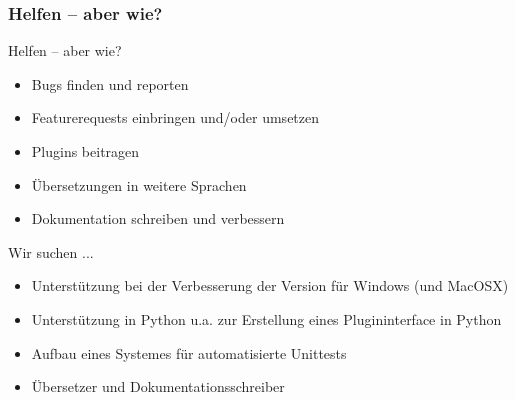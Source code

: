 \begin{frame}
	\frametitle{Helfen -- aber wie?}
	\begin{block}{Helfen -- aber wie?}
		\begin{itemize}
			\item Bugs finden und reporten
			\item Featurerequests einbringen und/oder umsetzen
			\item Plugins beitragen
			\item Übersetzungen in weitere Sprachen
			\item Dokumentation schreiben und verbessern
		\end{itemize}
	\end{block}
	\pause
	\begin{block}{Wir suchen ... }
		\begin{itemize}
			\item Unterstützung bei der Verbesserung der Version für
				  Windows (und MacOSX)
			\pause
			\item Unterstützung in Python u.a. zur Erstellung eines
				  Plugininterface in Python
			\pause
			\item Aufbau eines Systemes für automatisierte Unittests
			\pause
			\item Übersetzer und Dokumentationsschreiber
		\end{itemize}
	\end{block}
\end{frame}
